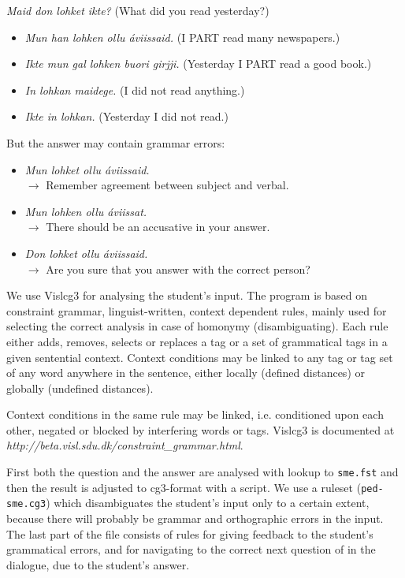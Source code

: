 \documentclass[a4paper,12pt]{article}
\begin{document}
\textit{Maid don lohket ikte?} (What did you read yesterday?)
\begin{itemize}
\item \textit{Mun han lohken ollu áviissaid.} (I PART read many newspapers.)
\item \textit{Ikte mun gal lohken buori girjji.} (Yesterday I PART read a good book.)
\item \textit{In lohkan maidege.} (I did not read anything.)
\item \textit{Ikte in lohkan.} (Yesterday I did not read.)
\end{itemize}


But the answer may contain grammar errors:

\begin{itemize}
\item \textit{Mun lohket ollu áviissaid.} \\ $\rightarrow$ Remember agreement between subject and verbal.  
\item \textit{Mun lohken ollu áviissat.} \\ $\rightarrow$ There should be an accusative in your answer. 
\item \textit{Don lohket ollu áviissaid.} \\ $\rightarrow$ Are you sure that you answer with the correct person?  
\end{itemize}

We use Vislcg3 for analysing the student's input. The program is based on constraint grammar, linguist-written, context dependent rules, mainly used for selecting the correct analysis in case of homonymy (disambiguating). Each rule either adds, removes, selects or replaces a tag or a set of grammatical tags in a given sentential context. Context conditions may be linked to any tag or tag set of any word anywhere in the sentence, either locally (defined distances) or globally (undefined distances). 

Context conditions in the same rule may be linked, i.e. conditioned upon each other, negated or blocked by interfering words or tags. Vislcg3 is documented at \textit{http://beta.visl.sdu.dk/constraint\_grammar.html}.

First both the question and the answer are analysed with lookup to \texttt{sme.fst} and then the result is adjusted to cg3-format with a script. We use a ruleset (\texttt{ped-sme.cg3}) which disambiguates the student's input only to a certain extent, because there will probably be grammar and orthographic errors in the input. The last part of the file consists of rules for giving feedback to the student's grammatical errors, and for navigating to the correct next question of in the dialogue, due to the student's answer.
\end{document}
